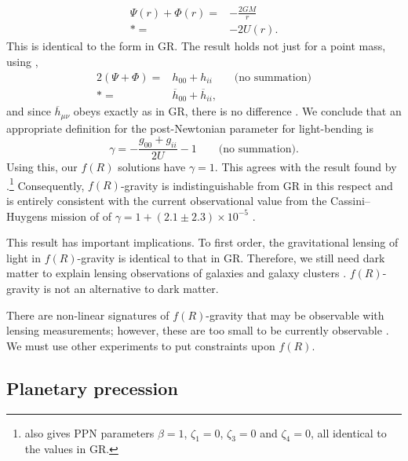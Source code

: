 \begin{align}
\Psi(r) + \Phi(r) = {} & -\frac{2GM}{r} \nonumber \\*
 = {} & -2U(r).
\end{align}
This is identical to the form in GR. The result holds not just for a point mass, using ,
\begin{align}
2\left(\Psi + \Phi\right) = {} & h_{00} + h_{ii} \qquad \text{(no summation)}\nonumber \\*
 = {} & \overline{h}_{00} + \overline{h}_{ii},
\end{align}
and since $\overline{h}_{\mu\nu}$ obeys  exactly as in GR, there is no difference \citep{Zhao2011}. We conclude that an appropriate definition for the post-Newtonian parameter for light-bending is
\begin{equation}
\gamma = -\frac{g_{00} + g_{ii}}{2U} - 1 \qquad \text{(no summation)}.
\end{equation}
Using this, our $f(R)$ solutions have $\gamma = 1$. This agrees with the result found by \citet{Clifton2008}.\footnote{\citet{Clifton2008} also gives PPN parameters $\beta = 1$, $\zeta_1 = 0$, $\zeta_3 = 0$ and $\zeta_4 = 0$, all identical to the values in GR.} Consequently, $f(R)$-gravity is indistinguishable from GR in this respect and is entirely consistent with the current observational value from the Cassini--Huygens mission of of $\gamma = 1 + (2.1 \pm 2.3) \times 10^{-5}$ \citep{Will2006, Bertotti2003}.

This result has important implications. To first order, the gravitational lensing of light in $f(R)$-gravity is identical to that in GR. Therefore, we still need dark matter to explain lensing observations of galaxies and galaxy clusters \citep{Lubini2011}. $f(R)$-gravity is not an alternative to dark matter.

There are non-linear signatures of $f(R)$-gravity that may be observable with lensing measurements; however, these are too small to be currently observable \citep{Vanderveld2011}. We must use other experiments to put constraints upon $f(R)$.

\subsection{Planetary precession}

